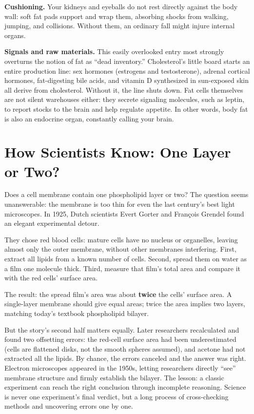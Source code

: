 \textbf{Cushioning.} Your kidneys and eyeballs do not rest directly against the body wall: soft fat pads support and wrap them, absorbing shocks from walking, jumping, and collisions. Without them, an ordinary fall might injure internal organs.

\textbf{Signals and raw materials.} This easily overlooked entry most strongly overturns the notion of fat as ``dead inventory.'' Cholesterol's little board starts an entire production line: sex hormones (estrogens and testosterone), adrenal cortical hormones, fat-digesting bile acids, and vitamin D synthesized in sun-exposed skin all derive from cholesterol. Without it, the line shuts down. Fat cells themselves are not silent warehouses either: they secrete signaling molecules, such as leptin, to report stocks to the brain and help regulate appetite. In other words, body fat is also an endocrine organ, constantly calling your brain.

\section{How Scientists Know: One Layer or Two?}

\begin{zhengju}
Does a cell membrane contain one phospholipid layer or two? The question seems unanswerable: the membrane is too thin for even the last century's best light microscopes. In 1925, Dutch scientists Evert Gorter and François Grendel found an elegant experimental detour.

They chose red blood cells: mature cells have no nucleus or organelles, leaving almost only the outer membrane, without other membranes interfering. First, extract all lipids from a known number of cells. Second, spread them on water as a film one molecule thick. Third, measure that film's total area and compare it with the red cells' surface area.

The result: the spread film's area was about \textbf{twice} the cells' surface area. A single-layer membrane should give equal areas; twice the area implies two layers, matching today's textbook phospholipid bilayer.

But the story's second half matters equally. Later researchers recalculated and found two offsetting errors: the red-cell surface area had been underestimated (cells are flattened disks, not the smooth spheres assumed), and acetone had not extracted all the lipids. By chance, the errors canceled and the answer was right. Electron microscopes appeared in the 1950s, letting researchers directly ``see'' membrane structure and firmly establish the bilayer. The lesson: a classic experiment can reach the right conclusion through incomplete reasoning. Science is never one experiment's final verdict, but a long process of cross-checking methods and uncovering errors one by one.
\end{zhengju}

